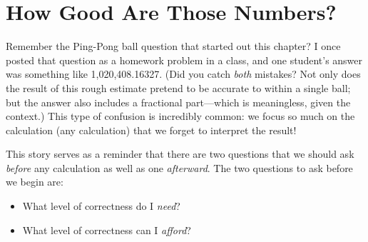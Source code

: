 % 


\section{How Good Are Those Numbers?}

   
Remember the Ping-Pong ball question that started out this chapter? I
once posted that question as a homework problem in a class, and one
student's answer was something like 1,020,408.16327.  (Did you catch
\emph{both} mistakes? Not only does the result of this rough estimate
pretend to be accurate to within a single ball; but the answer also
includes a fractional part---which is meaningless, given the context.)
This type of confusion is incredibly common: we focus so much on the
calculation (any calculation) that we forget to interpret the result!

This story serves as a reminder that there are two questions that we
should ask \emph{before} any calculation as well as one 
\emph{afterward}. The two questions to ask before we begin are:
\begin{itemize}
\item What level of correctness do I \emph{need}?
\item What level of correctness can I \emph{afford}?
\end{itemize}
\clearpage

